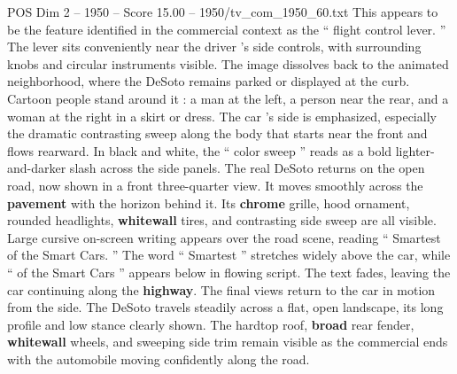 \begin{textsample}{POS Dim 2 – 1950 – Score 15.00 – 1950/tv\_com\_1950\_60.txt}
This appears to be the feature identified in the commercial context as the “ flight control lever. ” The lever sits conveniently near the driver ’s side controls, with surrounding knobs and circular instruments visible.
The image dissolves back to the animated neighborhood, where the DeSoto remains parked or displayed at the curb.
Cartoon people stand around it : a man at the left, a person near the rear, and a woman at the right in a skirt or dress.
The car ’s side is emphasized, especially the dramatic contrasting sweep along the body that starts near the front and flows rearward.
In black and white, the “ color sweep ” reads as a bold lighter-and-darker slash across the side panels.
The real DeSoto returns on the open road, now shown in a front three-quarter view.
It moves smoothly across the \textbf{pavement} with the horizon behind it.
Its \textbf{chrome} grille, hood ornament, rounded headlights, \textbf{whitewall} tires, and contrasting side sweep are all visible.
Large cursive on-screen writing appears over the road scene, reading “ Smartest of the Smart Cars. ” The word “ Smartest ” stretches widely above the car, while “ of the Smart Cars ” appears below in flowing script.
The text fades, leaving the car continuing along the \textbf{highway}.
The final views return to the car in motion from the side.
The DeSoto travels steadily across a flat, open landscape, its long profile and low stance clearly shown.
The hardtop roof, \textbf{broad} rear fender, \textbf{whitewall} wheels, and sweeping side trim remain visible as the commercial ends with the automobile moving confidently along the road.

\end{textsample}
